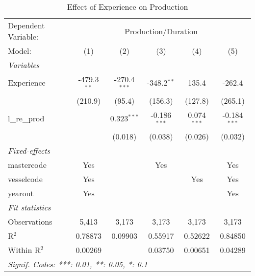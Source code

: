 
\begin{table}[htbp]
   \caption{\label{tab:n_voyage} Effect of Experience on Production}
   \centering
   \begin{tabular}{lccccc}
      \tabularnewline \midrule \midrule
      Dependent Variable: & \multicolumn{5}{c}{Production/Duration}\\
      Model:        & (1)           & (2)            & (3)            & (4)           & (5)\\  
      \midrule
      \emph{Variables}\\
      Experience    & -479.3$^{**}$ & -270.4$^{***}$ & -348.2$^{**}$  & 135.4         & -262.4\\   
                    & (210.9)       & (95.4)         & (156.3)        & (127.8)       & (265.1)\\   
      l\_re\_prod   &               & 0.323$^{***}$  & -0.186$^{***}$ & 0.074$^{***}$ & -0.184$^{***}$\\   
                    &               & (0.018)        & (0.038)        & (0.026)       & (0.032)\\   
      \midrule
      \emph{Fixed-effects}\\
      mastercode    & Yes           &                & Yes            &               & Yes\\  
      vesselcode    & Yes           &                &                & Yes           & Yes\\  
      yearout       & Yes           &                &                &               & Yes\\  
      \midrule
      \emph{Fit statistics}\\
      Observations  & 5,413         & 3,173          & 3,173          & 3,173         & 3,173\\  
      R$^2$         & 0.78873       & 0.09903        & 0.55917        & 0.52622       & 0.84850\\  
      Within R$^2$  & 0.00269       &                & 0.03750        & 0.00651       & 0.04289\\  
      \midrule \midrule
      \multicolumn{6}{l}{\emph{Signif. Codes: ***: 0.01, **: 0.05, *: 0.1}}\\
   \end{tabular}
\end{table}


